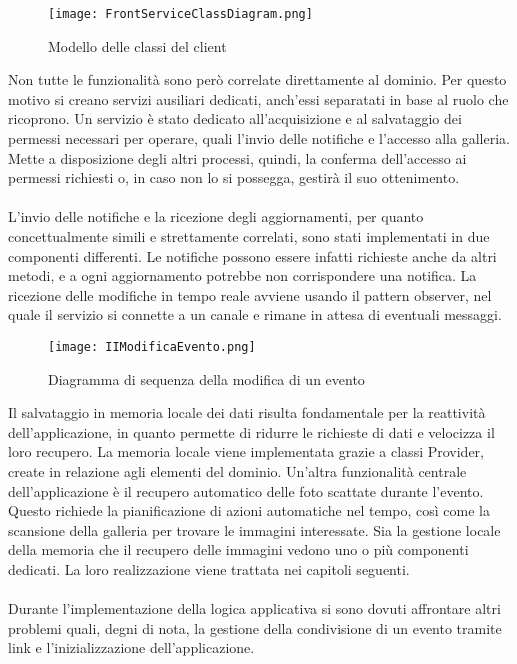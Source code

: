 \clearpage 

\begin{figure}[h!]
    \begin{center}
        \texttt{[image: FrontServiceClassDiagram.png]}
        \caption{Modello delle classi del client}
    \end{center}
\end{figure}

Non tutte le funzionalità sono però correlate direttamente al dominio.
Per questo motivo si creano servizi ausiliari dedicati, 
anch'essi separatati in base al ruolo che ricoprono.
\clearpage
Un servizio è stato dedicato all'acquisizione e 
al salvataggio dei permessi necessari per operare, 
quali l'invio delle notifiche e l'accesso alla galleria. 
Mette a disposizione degli altri processi, quindi, la conferma dell'accesso ai permessi richiesti o, 
in caso non lo si possegga, gestirà il suo ottenimento.\\ 
\\
L'invio delle notifiche e la ricezione degli aggiornamenti, 
per quanto concettualmente simili e strettamente correlati,
sono stati implementati in due componenti differenti. 
Le notifiche possono essere infatti richieste anche da altri metodi, 
e a ogni aggiornamento potrebbe non corrispondere una notifica.
La ricezione delle modifiche in tempo reale avviene usando il pattern observer, 
nel quale il servizio si connette a un canale e rimane in attesa di eventuali messaggi.\\

\begin{figure}[h!]
    \begin{center}
        \texttt{[image: IIModificaEvento.png]}
        \caption{Diagramma di sequenza della modifica di un evento}
    \end{center}
\end{figure}

\clearpage

Il salvataggio in memoria locale dei dati risulta fondamentale per la reattività dell'applicazione,
in quanto permette di ridurre le richieste di dati e velocizza il loro recupero.
La memoria locale viene implementata grazie a classi Provider, create in relazione agli elementi del dominio.
Un'altra funzionalità centrale dell'applicazione è il recupero automatico 
delle foto scattate durante l'evento. 
Questo richiede la pianificazione di azioni automatiche nel tempo,
così come la scansione della galleria per trovare le immagini interessate.
Sia la gestione locale della memoria che il recupero delle immagini vedono uno o più componenti dedicati.
La loro realizzazione viene trattata nei capitoli seguenti.\\
\\
Durante l'implementazione della logica applicativa 
si sono dovuti affrontare altri problemi quali, degni di nota, 
la gestione della condivisione di un evento tramite link e
 l'inizializzazione dell'applicazione.\\

